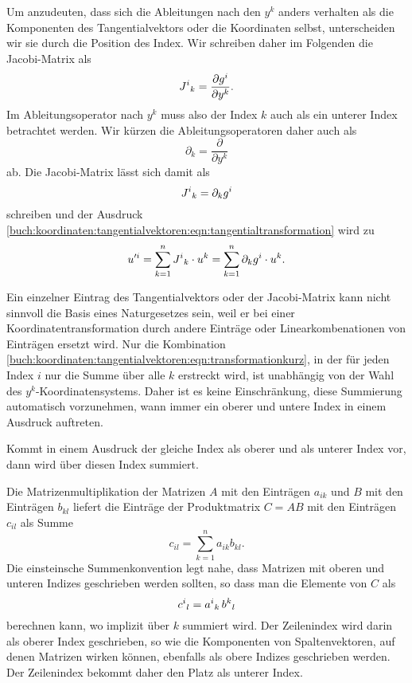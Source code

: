 Um anzudeuten, dass sich die Ableitungen nach den $y^k$ anders verhalten
als die Komponenten des Tangentialvektors oder die Koordinaten selbst,
unterscheiden wir sie durch die Position des Index.
Wir schreiben daher im Folgenden die Jacobi-Matrix als
\[
J^i\mathstrut_k
=
\frac{\partial g^i}{\partial y^k}.
\]
Im Ableitungsoperator nach $y^k$ muss also der Index $k$ auch als ein 
unterer Index betrachtet werden.
Wir kürzen die Ableitungsoperatoren daher auch als
\[
\partial_k = \frac{\partial}{\partial y^k}
\]
ab.
Die Jacobi-Matrix lässt sich damit als
\[
J^i\mathstrut_k = \partial_k g^i
\]
schreiben und der Ausdruck
\eqref{buch:koordinaten:tangentialvektoren:eqn:tangentialtransformation}
wird zu
\begin{equation}
u^{\prime i}
=
\sum_{k=1}^n J^i\mathstrut_k \cdot u^k
=
\sum_{k=1}^n \partial_kg^i\cdot u^k.
\label{buch:koordinaten:tangentialvektoren:eqn:transformationkurz}
\end{equation}

Ein einzelner Eintrag des Tangentialvektors oder der Jacobi-Matrix
kann nicht sinnvoll die Basis eines Naturgesetzes sein, weil er bei
einer Koordinatentransformation durch andere Einträge oder Linearkombenationen
von Einträgen ersetzt wird.
Nur die Kombination
\eqref{buch:koordinaten:tangentialvektoren:eqn:transformationkurz},
in der für jeden Index $i$ nur die Summe über alle $k$ erstreckt
wird, ist unabhängig von der Wahl des $y^k$-Koordinatensystems.
Daher ist es keine Einschränkung, diese Summierung automatisch
vorzunehmen, wann immer ein oberer und untere Index in einem Ausdruck
auftreten.

\begin{definition}
\label{buch:koordinaten:tangentialvektoren:def:einsteinschesummenkonvention}
Kommt in einem Ausdruck der gleiche Index als oberer und als unterer
Index vor, dann wird über diesen Index summiert.
\end{definition}

Die Matrizenmultiplikation der Matrizen $A$ mit den Einträgen $a_{ik}$ und
$B$ mit den Einträgen $b_{kl}$ liefert die Einträge der Produktmatrix
$C=AB$ mit den Einträgen $c_{il}$ als Summe
\[
c_{il}
=
\sum_{k=1}^n
a_{ik} b_{kl}.
\]
Die einsteinsche Summenkonvention legt nahe, dass Matrizen mit oberen
und unteren Indizes geschrieben werden sollten, so dass man die
Elemente von $C$ als
\[
c^i\mathstrut_l
=
a^i\mathstrut_k\,
b^k\mathstrut_l
\]
berechnen kann, wo implizit über $k$ summiert wird.
Der Zeilenindex wird darin als oberer Index geschrieben, so wie
die Komponenten von Spaltenvektoren, auf denen Matrizen wirken können, 
ebenfalls als obere Indizes geschrieben werden.
Der Zeilenindex bekommt daher den Platz als unterer Index.

